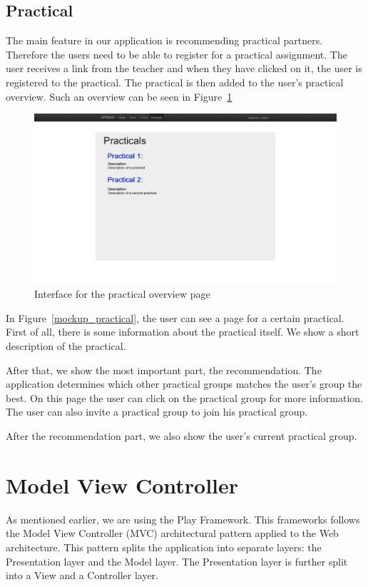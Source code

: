 \subsection{Practical}
The main feature in our application is recommending practical partners.
Therefore the users need to be able to register for a practical assignment.
The user receives a link from the teacher and when they have clicked on it, the user is registered to the practical.
The practical is then added to the user's practical overview.
Such an overview can be seen in Figure~\ref{mockup_practical_overview}

\begin{figure}[H]
    \centering
    \captionsetup{justification=centering}
    \includegraphics[width=\textwidth, frame]{images/mockup_practical_overview}
    \caption{Interface for the practical overview page}
    \label{mockup_practical_overview}
\end{figure}

In Figure~\ref{mockup_practical}, the user can see a page for a certain practical.
First of all, there is some information about the practical itself.
We show a short description of the practical.

After that, we show the most important part, the recommendation.
The application determines which other practical groups matches the user's group the best.
On this page the user can click on the practical group for more information.
The user can also invite a practical group to join his practical group.

After the recommendation part, we also show the user's current practical group.

\section{Model View Controller}
\label{sec:mvc}
As mentioned earlier, we are using the Play Framework. 
This frameworks follows the Model View Controller (MVC) architectural pattern applied to the Web architecture\cite{playframework_mvc}.
This pattern splits the application into separate layers: the Presentation layer and the Model layer. 
The Presentation layer is further split into a View and a Controller layer.

